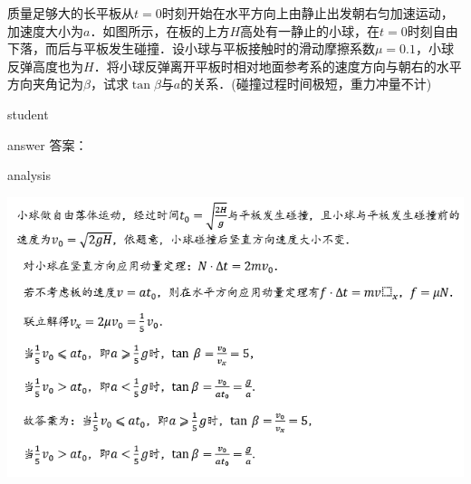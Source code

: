  \begin{example}
 	 质量足够大的长平板从$ t=0 $时刻开始在水平方向上由静止出发朝右匀加速运动，加速度大小为$ a $．如图所示，在板的上方$ H $高处有一静止的小球，在$ t=0 $时刻自由下落，而后与平板发生碰撞．设小球与平板接触时的滑动摩擦系数$ \mu=0.1 $，小球反弹高度也为$ H $．将小球反弹离开平板时相对地面参考系的速度方向与朝右的水平方向夹角记为$ \beta $，试求$ \tan\beta $与$ a $的关系．(碰撞过程时间极短，重力冲量不计)
 	 
 	
 	\begin{taggedblock}{student}
 		\vspace*{2cm}
 	\end{taggedblock}
 	
 	
 	\begin{taggedblock}{answer}
 		答案：
 	\end{taggedblock}
 	
 	
 	\begin{taggedblock}{analysis}
 		\begin{center}
\includegraphics[width=0.8\linewidth]{image/momentum-2}
\end{center}

 	\end{taggedblock}
 \end{example}
 
